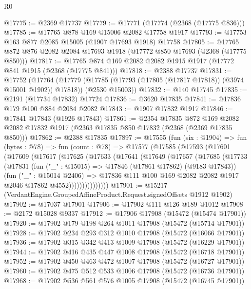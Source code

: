 \begin{lexlean}{R0}
\begin{coremodule}
@17775 := @2369 @17737
@17779 := @17771 (@17774 (@2368 (@17775 @836)))
@17785 := @17765 @878 @169 @15006 @2082 @17758 @1917
@17793 := @17753 @163 @877 @2085 @15005 (@1907 @17693 @1918) @17758
@17805 := @17765 @872 @876 @2082 @2084 @17693 @1918 (@17772 @850 @17693 (@2368 (@17775 @850)))
@17817 := @17765 @874 @169 @2082 @2082 @1915 @1917 (@17772 @841 @1915 (@2368 (@17775 @841)))
@17818 := @2388 @17737
@17831 := @17752
    (@17764
      (@17779 (@17785 (@17793 (@17805 (@17817 @17818)) (@3974 @15001 @1902)) @17818))
      (@2530 @15003))
@17832 := @140 @17745
@17835 := @2191 (@17734 @17832) @17724
@17836 := @3620 @17835
@17841 := @17836 @179 @100 @884 @2084 @2082
@17843 := @1907 @17832 @1917
@17846 := @17841 @17843 (@1926 @17843)
@17861 := @2354
    @17835
    @872
    @169
    @2082
    @2082
    @17832
    @1917
    (@2363 @17835 @850 @17832 (@2368 (@2369 @17835 @850)))
@17862 := @2388 @17835
@17897 := @17555
    (fun (six : @1904) =>
    fun (bytes : @78) =>
    fun (count : @78) =>
    @17577
      (@17585
        (@17593
          (@17601
            (@17609
              (@17617
                (@17625
                  (@17633
                    (@17641
                      (@17649
                        (@17657
                          (@17685
                            (@17733
                              (@17831
                                (fun ("_" : @15015) => @17846 (@17861 @17862) (@9183 @17843))
                                (fun ("_" : @15014 @2406) =>
                                @17836
                                  @111
                                  @100
                                  @169
                                  @2082
                                  @2082
                                  @1917
                                  @2046
                                  @17862
                                  @4552)))))))))))))))
@17901 := @15217 (VerdantEngine.GroupedAffineProduct.Request.signedOffsets @1912 @1902)
@17902 := @17037 @17901
@17906 := @17902 @111 @126 @189 @1012
@17908 := @2172 @15028 @9337
@17912 := @17906 @17908 (@15472 (@15474 @17901))
@17920 := @17902 @179 @198 @264 @1011 @17908 (@15472 (@15714 @17901))
@17928 := @17902 @234 @293 @312 @1010 @17908 (@15472 (@16066 @17901))
@17936 := @17902 @315 @342 @413 @1009 @17908 (@15472 (@16229 @17901))
@17944 := @17902 @416 @435 @447 @1008 @17908 (@15472 (@16718 @17901))
@17952 := @17902 @450 @463 @472 @1007 @17908 (@15472 (@16727 @17901))
@17960 := @17902 @475 @512 @533 @1006 @17908 (@15472 (@16736 @17901))
@17968 := @17902 @536 @561 @576 @1005 @17908 (@15472 (@16745 @17901))

\end{coremodule}
\end{lexlean}
